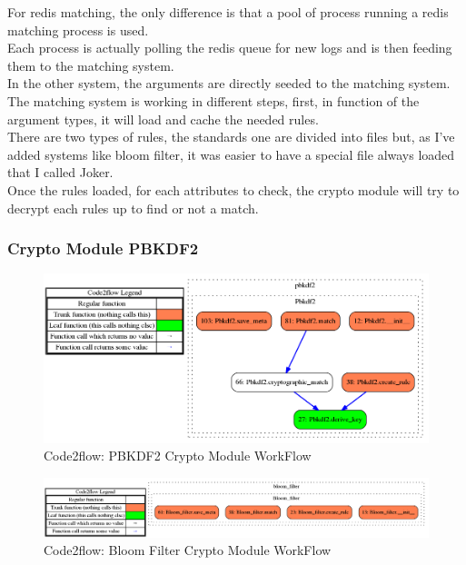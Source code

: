 \documentclass{eplmastersthesis}
\begin{document}
For redis matching, the only difference is that a pool of process running a redis matching process is used.\\
Each process is actually polling the redis queue for new logs and is then feeding them to the matching system.\\
In the other system, the arguments are directly seeded to the matching system.\\

The matching system is working in different steps, first, in function of the argument types, it will load and cache the needed rules.\\
There are two types of rules, the standards one are divided into files but, as I've added systems like bloom filter, it was easier to have a special file always loaded that I called Joker.\\

Once the rules loaded, for each attributes to check, the crypto module will try to decrypt each rules up to find or not a match.

\subsubsection{Crypto Module PBKDF2}

\begin{figure}[h!]
\begin{center}
	\includegraphics[scale=0.3]{res/flowPBKDF2}
	\caption{Code2flow: PBKDF2 Crypto Module WorkFlow}
	\label{code2flow-pbkdf2}
\end{center}
\end{figure}

\begin{figure}[h!]
\begin{center}
	\includegraphics[scale=0.3]{res/flowBloomFilter}
	\caption{Code2flow: Bloom Filter Crypto Module WorkFlow}
	\label{code2flow-bloom}
\end{center}
\end{figure}
\end{document}
